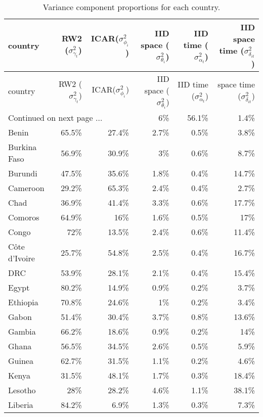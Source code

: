 \documentclass[12pt]{article}\usepackage[]{graphicx}\usepackage[]{color}
\begin{document}
\small
\begin{longtable}{lrrrrr}
\caption{Variance component proportions for each country.} \label{tab:var} \\
  \toprule
country & RW2 ($\sigma^2_{\gamma_t}$)& ICAR($\sigma^2_{\phi_i}$) & IID space ($\sigma^2_{\theta_i}$) & IID time ($\sigma^2_{\alpha_t}$) & IID space time ($\sigma^2_{\delta_{it}}$) \\ 
  \midrule
  \endfirsthead
  \toprule
country & RW2 ($\sigma^2_{\gamma_t}$)& ICAR($\sigma^2_{\phi_i}$) & IID space ($\sigma^2_{\theta_i}$) & IID time ($\sigma^2_{\alpha_t}$) & space time ($\sigma^2_{\delta_{it}}$) \\ 
  \midrule
  \endhead
\multicolumn{3}{l}{{\footnotesize Continued on next page $\dots$}}
\endfoot
\endlastfoot
 Angola & 6\% & 56.1\% & 1.4\% & 0.3\% & 36.3\% \\ 
  Benin & 65.5\% & 27.4\% & 2.7\% & 0.5\% & 3.8\% \\ 
  Burkina Faso & 56.9\% & 30.9\% & 3\% & 0.6\% & 8.7\% \\ 
  Burundi & 47.5\% & 35.6\% & 1.8\% & 0.4\% & 14.7\% \\ 
  Cameroon & 29.2\% & 65.3\% & 2.4\% & 0.4\% & 2.7\% \\ 
  Chad & 36.9\% & 41.4\% & 3.3\% & 0.6\% & 17.7\% \\ 
  Comoros & 64.9\% & 16\% & 1.6\% & 0.5\% & 17\% \\ 
  Congo & 72\% & 13.5\% & 2.4\% & 0.6\% & 11.4\% \\ 
  C\^{o}te d'Ivoire & 25.7\% & 54.8\% & 2.5\% & 0.4\% & 16.7\% \\ 
  DRC & 53.9\% & 28.1\% & 2.1\% & 0.4\% & 15.4\% \\ 
  Egypt & 80.2\% & 14.9\% & 0.9\% & 0.2\% & 3.7\% \\ 
  Ethiopia & 70.8\% & 24.6\% & 1\% & 0.2\% & 3.4\% \\ 
  Gabon & 51.4\% & 30.4\% & 3.7\% & 0.8\% & 13.6\% \\ 
  Gambia & 66.2\% & 18.6\% & 0.9\% & 0.2\% & 14\% \\ 
  Ghana & 56.5\% & 34.5\% & 2.6\% & 0.5\% & 5.9\% \\ 
  Guinea & 62.7\% & 31.5\% & 1.1\% & 0.2\% & 4.6\% \\ 
  Kenya & 31.5\% & 48.1\% & 1.7\% & 0.3\% & 18.4\% \\ 
  Lesotho & 28\% & 28.2\% & 4.6\% & 1.1\% & 38.1\% \\ 
  Liberia & 84.2\% & 6.9\% & 1.3\% & 0.3\% & 7.3\% \\ 

\end{longtable}
\end{document}
